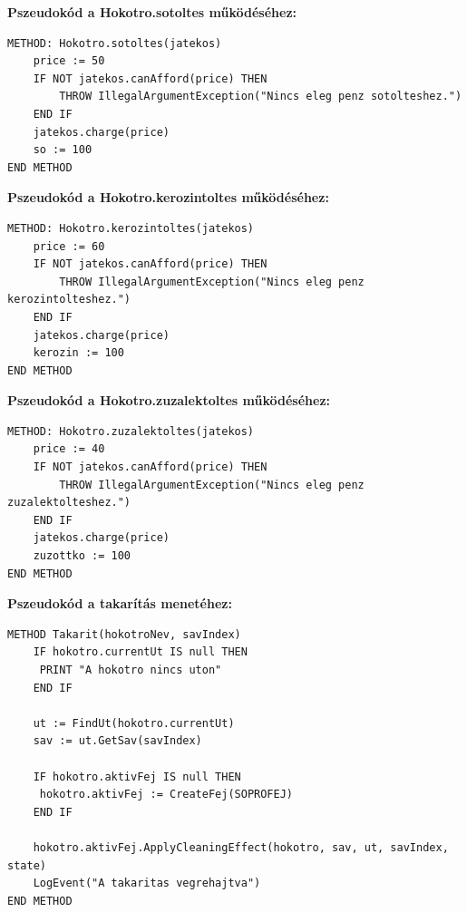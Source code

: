 \begin{class-template-method}
\end{class-template-method}

\textbf{Pszeudokód a Hokotro.sotoltes működéséhez:}
\begin{verbatim}
METHOD: Hokotro.sotoltes(jatekos)
    price := 50
    IF NOT jatekos.canAfford(price) THEN
        THROW IllegalArgumentException("Nincs eleg penz sotolteshez.")
    END IF
    jatekos.charge(price)
    so := 100
END METHOD
\end{verbatim}

\textbf{Pszeudokód a Hokotro.kerozintoltes működéséhez:}
\begin{verbatim}
METHOD: Hokotro.kerozintoltes(jatekos)
    price := 60
    IF NOT jatekos.canAfford(price) THEN
        THROW IllegalArgumentException("Nincs eleg penz kerozintolteshez.")
    END IF
    jatekos.charge(price)
    kerozin := 100
END METHOD
\end{verbatim}

\textbf{Pszeudokód a Hokotro.zuzalektoltes működéséhez:}
\begin{verbatim}
METHOD: Hokotro.zuzalektoltes(jatekos)
    price := 40
    IF NOT jatekos.canAfford(price) THEN
        THROW IllegalArgumentException("Nincs eleg penz zuzalektolteshez.")
    END IF
    jatekos.charge(price)
    zuzottko := 100
END METHOD
\end{verbatim}

\textbf{Pszeudokód a takarítás menetéhez:}
\begin{verbatim}
METHOD Takarit(hokotroNev, savIndex)
    IF hokotro.currentUt IS null THEN
     PRINT "A hokotro nincs uton"
    END IF

    ut := FindUt(hokotro.currentUt)
    sav := ut.GetSav(savIndex)

    IF hokotro.aktivFej IS null THEN
     hokotro.aktivFej := CreateFej(SOPROFEJ)
    END IF

    hokotro.aktivFej.ApplyCleaningEffect(hokotro, sav, ut, savIndex, state)
    LogEvent("A takaritas vegrehajtva")
END METHOD
\end{verbatim}


